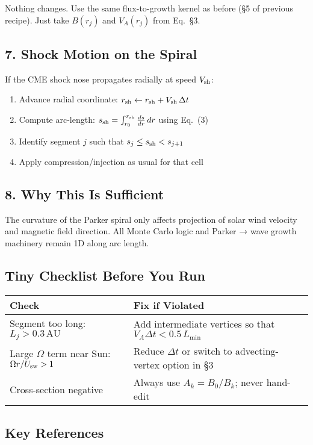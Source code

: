 Nothing changes. Use the same flux-to-growth kernel as before (§5 of previous recipe). Just take $B(r_j)$ and $V_A(r_j)$ from Eq.~§3.

\subsection*{7. Shock Motion on the Spiral}

If the CME shock nose propagates radially at speed $V_{\rm sh}$:

\begin{enumerate}
\item Advance radial coordinate: $r_{\rm sh} \leftarrow r_{\rm sh} + V_{\rm sh}\,\Delta t$
\item Compute arc-length: $s_{\rm sh} = \int_{r_0}^{r_{\rm sh}} \frac{ds}{dr}\,dr$ using Eq.~(3)
\item Identify segment $j$ such that $s_j \leq s_{\rm sh} < s_{j+1}$
\item Apply compression/injection as usual for that cell
\end{enumerate}

\subsection*{8. Why This Is Sufficient}

The curvature of the Parker spiral only affects projection of solar wind velocity and magnetic field direction. All Monte Carlo logic and Parker → wave growth machinery remain 1D along arc length.

\subsection*{Tiny Checklist Before You Run}

\begin{tabular}{|p{6cm}|p{8cm}|}
\hline
\textbf{Check} & \textbf{Fix if Violated} \\
\hline
Segment too long: $L_j > 0.3\,\text{AU}$ & Add intermediate vertices so that $V_A\Delta t < 0.5\,L_{\min}$ \\
Large $\Omega$ term near Sun: $\Omega r/U_{\rm sw} > 1$ & Reduce $\Delta t$ or switch to advecting-vertex option in §3 \\
Cross-section negative & Always use $A_k = B_0/B_k$; never hand-edit \\
\hline
\end{tabular}

\subsection*{Key References}

